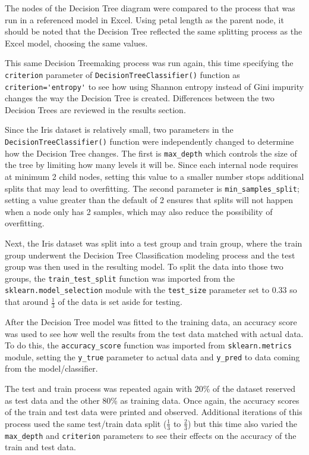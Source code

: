 \documentclass[journal]{IEEEtran}
\begin{document}
The nodes of the Decision Tree diagram were compared to the process that was run in a referenced model in Excel. Using petal length as the parent node, it should be noted that the Decision Tree reflected the same splitting process as the Excel model, choosing the same values.

This same Decision Tree\textemdash making process was run again, this time specifying the \lstinline{criterion} parameter of \lstinline{DecisionTreeClassifier()} function as \lstinline{criterion='entropy'} to see how using Shannon entropy instead of Gini impurity changes the way the Decision Tree is created. Differences between the two Decision Trees are reviewed in the results section.

Since the Iris dataset is relatively small, two parameters in the \lstinline{DecisionTreeClassifier()} function were independently changed to determine how the Decision Tree changes. The first is \lstinline{max_depth} which controls the size of the tree by limiting how many levels it will be. Since each internal node requires at minimum 2 child nodes, setting this value to a smaller number stops additional splits that may lead to overfitting. The second parameter is \lstinline{min_samples_split}; setting a value greater than the default of 2 ensures that splits will not happen when a node only has 2 samples, which may also reduce the possibility of overfitting. 

Next, the Iris dataset was split into a test group and train group, where the train group underwent the Decision Tree Classification modeling process and the test group was then used in the resulting model. To split the data into those two groups, the \lstinline{train_test_split} function was imported from the \lstinline{sklearn.model_selection} module with the \lstinline{test_size} parameter set to 0.33 so that around \(\frac{1}{3}\) of the data is set aside for testing. 

After the Decision Tree model was fitted to the training data, an accuracy score was used to see how well the results from the test data matched with actual data. To do this, the \lstinline{accuracy_score} function was imported from \lstinline{sklearn.metrics} module, setting the \lstinline{y_true} parameter to actual data and \lstinline{y_pred} to data coming from the model/classifier. 

The test and train process was repeated again with 20\% of the dataset reserved as test data and the other 80\% as training data. Once again, the accuracy scores of the train and test data were printed and observed. Additional iterations of this process used the same test/train data split (\(\frac{1}{3}\) to \(\frac{2}{3}\)) but this time also varied the \lstinline{max_depth} and \lstinline{criterion} parameters to see their effects on the accuracy of the train and test data.
\end{document}
